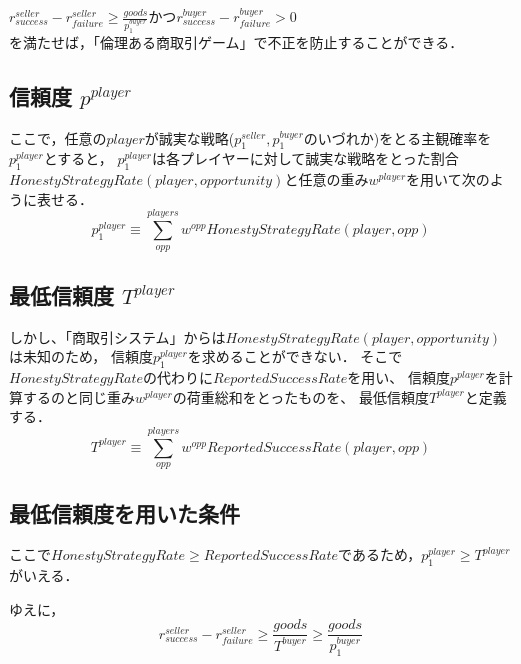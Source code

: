 $ r^{seller}_{success} - r^{seller}_{failure} \geq \frac{goods}{p^{buyer}_1} $かつ$ r^{buyer}_{success} - r^{buyer}_{failure} > 0 $ \\

を満たせば，「倫理ある商取引ゲーム」で不正を防止することができる．


\subsection{信頼度 $ p^{player} $}

ここで，任意の$ player $が誠実な戦略($ p^{seller}_1, p^{buyer}_1 $のいづれか)をとる主観確率を$ p^{player}_1 $とすると，
$ p^{player}_1 $は各プレイヤーに対して誠実な戦略をとった割合$ HonestyStrategyRate(player, opportunity) $と任意の重み$ w^{player} $を用いて次のように表せる． \\

\begin{equation}
  p^{player}_1 \equiv \sum^{players}_{opp} w^{opp} HonestyStrategyRate(player, opp)
\end{equation}

\subsection{最低信頼度 $ T^{player} $}

しかし、「商取引システム」からは$ HonestyStrategyRate(player, opportunity) $は未知のため，
信頼度$ p^{player}_1 $を求めることができない．
そこで$ HonestyStrategyRate $の代わりに$ ReportedSuccessRate $を用い、
信頼度$ p^{player} $を計算するのと同じ重み$ w^{player} $の荷重総和をとったものを、
最低信頼度$ T^{player} $と定義する． \\

\begin{equation}
  T^{player} \equiv \sum^{players}_{opp} {w}^{opp} ReportedSuccessRate(player, opp)
\end{equation}

\subsection{最低信頼度を用いた条件}
ここで$ HonestyStrategyRate \geq ReportedSuccessRate $であるため，$ p^{player}_1 \geq T^{player} $がいえる．

ゆえに， \\

\begin{equation}
  r^{seller}_{success} - r^{seller}_{failure}  \geq \frac{goods}{T^{buyer}} \geq \frac{goods}{p^{buyer}_1}
\end{equation}

